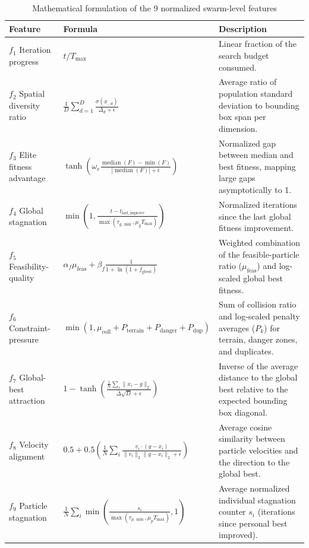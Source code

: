 \documentclass[final,5p,times]{elsarticle}
\def\small{}%
\newcommand{\symPopsize}{N}
\newcommand{\symMaxIters}{T_{\text{max}}}
\newcommand{\symFeatWeightA}{\alpha_{f}}
\newcommand{\symFeatWeightB}{\beta_{f}}
\newcommand{\symScaleElite}{\omega_e}
\newcommand{\symStagMinGlobal}{\tau_{g,\min}}
\newcommand{\symStagRatioGlobal}{\mu_g}
\newcommand{\symStagMinPart}{\tau_{p,\min}}
\newcommand{\symStagRatioPart}{\mu_p}
\begin{document}
\begin{table}[htbp]
\centering
\small
\caption{Mathematical formulation of the 9 normalized swarm-level features }
\label{tab:state_features}
\renewcommand{\arraystretch}{1.3}
\begin{tabular}{llp{9.2cm}}
\hline
\textbf{Feature} & \textbf{Formula} & \textbf{Description} \\
\hline
$f_1$ Iteration progress & $t / \symMaxIters$ & Linear fraction of the search budget consumed. \\
$f_2$ Spatial diversity ratio & $\frac{1}{D} \sum_{d=1}^D \frac{\sigma(x_{\cdot,d})}{\Delta_d + \epsilon}$ & Average ratio of population standard deviation to bounding box span per dimension. \\
$f_3$ Elite fitness advantage & $\tanh\left(\symScaleElite \frac{\operatorname{median}(F) - \min(F)}{|\operatorname{median}(F)| + \epsilon}\right)$ & Normalized gap between median and best fitness, mapping large gaps asymptotically to 1. \\
$f_4$ Global stagnation & $\min\left(1, \frac{t - t_{\text{last\_improve}}}{\max(\symStagMinGlobal, \symStagRatioGlobal \symMaxIters)}\right)$ & Normalized iterations since the last global fitness improvement. \\
$f_5$ Feasibility-quality & $\symFeatWeightA \mu_{\text{feas}} + \symFeatWeightB \frac{1}{1 + \ln(1 + f_{\text{gbest}})}$ & Weighted combination of the feasible-particle ratio ($\mu_{\text{feas}}$) and log-scaled global best fitness. \\
$f_6$ Constraint-pressure & $\min(1, \mu_{\text{coll}} + P_{\text{terrain}} + P_{\text{danger}} + P_{\text{dup}})$ & Sum of collision ratio and log-scaled penalty averages ($P_k$) for terrain, danger zones, and duplicates. \\
$f_7$ Global-best attraction & $1 - \tanh\left(\frac{\frac{1}{\symPopsize}\sum_i \|x_i - g\|_2}{\bar{\Delta}\sqrt{D} + \epsilon}\right)$ & Inverse of the average distance to the global best relative to the expected bounding box diagonal. \\
$f_8$ Velocity alignment & $0.5 + 0.5 \left( \frac{1}{\symPopsize}\sum_i \frac{v_i \cdot (g - x_i)}{\|v_i\|_2 \|g - x_i\|_2 + \epsilon} \right)$ & Average cosine similarity between particle velocities and the direction to the global best. \\
$f_9$ Particle stagnation & $\frac{1}{\symPopsize} \sum_i \min\left( \frac{s_i}{\max(\symStagMinPart, \symStagRatioPart \symMaxIters)}, 1 \right)$ & Average normalized individual stagnation counter $s_i$ (iterations since personal best improved). \\
\hline
\end{tabular}
\end{table}
\end{document}
